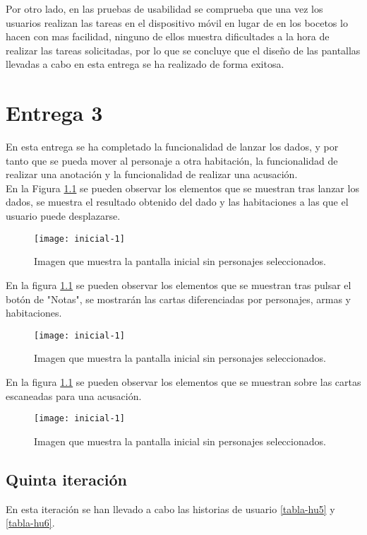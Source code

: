 \begin{itemize}
Por otro lado, en las pruebas de usabilidad se comprueba que una vez los usuarios realizan las tareas en el dispositivo móvil en lugar de en los bocetos lo hacen con mas facilidad, ninguno de ellos muestra dificultades a la hora de realizar las tareas solicitadas, por lo que se concluye que el diseño de las pantallas llevadas a cabo en esta entrega se ha realizado de forma exitosa.

\section{Entrega 3}
En esta entrega se ha completado la funcionalidad de lanzar los dados, y por tanto que se pueda mover al personaje a otra habitación, la funcionalidad de realizar una anotación y la funcionalidad de realizar una acusación.\\

En la Figura \ref{} se pueden observar los elementos que se muestran tras lanzar los dados, se muestra el resultado obtenido del dado y las habitaciones a las que el usuario puede desplazarse.

\begin{figure}[h]
  \centering
  \texttt{[image: inicial-1]}
  \caption{Imagen que muestra la pantalla inicial sin personajes seleccionados.}
  \label{figura-inicial-1}
\end{figure}

En la figura \ref{} se pueden observar los elementos que se muestran tras pulsar el botón de "Notas", se mostrarán las cartas diferenciadas por personajes, armas y habitaciones.

\begin{figure}[h]
  \centering
  \texttt{[image: inicial-1]}
  \caption{Imagen que muestra la pantalla inicial sin personajes seleccionados.}
  \label{figura-inicial-1}
\end{figure}

En la figura \ref{} se pueden observar los elementos que se muestran sobre las cartas escaneadas para una acusación.

\begin{figure}[h]
  \centering
  \texttt{[image: inicial-1]}
  \caption{Imagen que muestra la pantalla inicial sin personajes seleccionados.}
  \label{figura-inicial-1}
\end{figure}


\subsection{Quinta iteración}
En esta iteración se han llevado a cabo las historias de usuario \ref{tabla-hu5} y \ref{tabla-hu6}.\\


\end{itemize}
